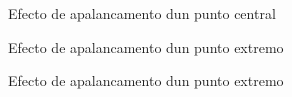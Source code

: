 \documentclass[ignorenonframetext, noae]{beamer}
\begin{document}
\begin{frame}{Efecto de apalancamento dun punto central}
\end{frame}

\begin{frame}{Efecto de apalancamento dun punto extremo}
\end{frame}

\begin{frame}{Efecto de apalancamento dun punto extremo}
\end{frame}
\end{document}
